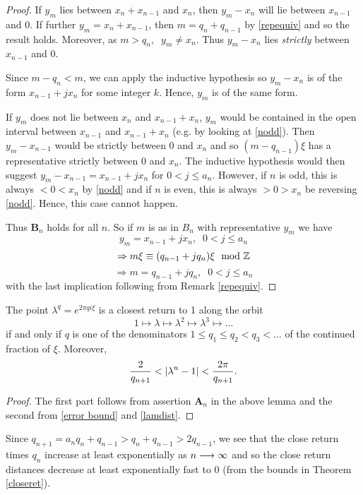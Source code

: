 \documentclass[../main.tex]{subfiles}
\begin{document}
\begin{proof}
If $y_{m}$ lies between $x_{n} + x_{n-1}$ and $x_{n}$, then $y_{m} - x_{n}$ will lie between $x_{n-1}$ and $0$. If further $y_{m} = x_{n} + x_{n-1}$, then $m = q_{n} + q_{n-1}$ by \eqref{repequiv} and so the result holds. Moreover, as $m > q_{n},\;\; y_{m} \neq x_{n}$. Thus $y_{m} - x_{n}$ lies \emph{strictly} between $x_{n-1}$ and $0$.

Since $m - q_{n} < m$, we can apply the inductive hypothesis so $y_{m} - x_{n}$ is of the form $x_{n-1} + jx_{n}$ for some integer $k$. Hence, $y_{m}$ is of the same form.

If $y_{m}$ does not lie between $x_{n}$ and $x_{n-1} + x_{n}$, $y_{m}$ would be contained in the open interval between $x_{n-1}$ and $x_{n-1} + x_{n}$ (e.g. by looking at \eqref{nodd}). Then $y_{m} - x_{n-1}$ would be strictly between $0$ and $x_{n}$ and so $(m - q_{n-1})\xi$ has a representative strictly between $0$ and $x_{n}$. The inductive hypothesis would then suggest $y_{m} - x_{n-1} = x_{n-1} + jx_{n}$ for $0 < j \leq a_{n}$. However, if $n$ is odd, this is always $< 0 < x_{n}$ by \eqref{nodd} and if $n$ is even, this is always $> 0 > x_{n}$ be reversing \eqref{nodd}. Hence, this case cannot happen.

Thus \textbf{B$_{n}$} holds for all $n$. So if $m$ is as in $B_{n}$ with representative $y_{m}$ we have
\[
y_{m} = x_{n-1} + jx_{n}, \;\; 0 < j \leq a_{n}
\]
\[
\Rightarrow m\xi \equiv (q_{n-1} + jq_{n})\xi \mod{\mathbb{Z}}
\]
\[
\Rightarrow m = q_{n-1} + jq_{n}, \;\; 0 < j \leq a_{n}
\]
with the last implication following from Remark \eqref{repequiv}.
\end{proof}

\begin{thm}\label{closeret}
The point $\lambda^q = e^{2\pi q i\xi}$ is a closest return to 1 along the orbit
\[
1 \longmapsto \lambda \longmapsto \lambda^2 \longmapsto \lambda^3 \longmapsto \dots
\]
if and only if $q$ is one of the denominators $1 \leq q_{1} \leq q_{2} < q_{3} < \dots$ of the continued fraction of $\xi$. Moreover,
\[
\frac{2}{q_{n+1}} < \left|\lambda^n - 1\right| <\frac{2\pi}{q_{n+1}}.
\]
\end{thm}
\begin{proof}
The first part follows from assertion \textbf{A$_{n}$} in the above lemma and the second from \eqref{error bound} and \eqref{lamdist}.
\end{proof}

Since $q_{n+1} = a_{n}q_{n} + q_{n-1} > q_{n} + q_{n-1} > 2q_{n-1}$, we see that the close return times $q_{n}$ increase at least exponentially as $n \longrightarrow \infty$ and so the close return distances decrease at least exponentially fast to $0$ (from the bounds in Theorem \ref{closeret}).
\end{document}
